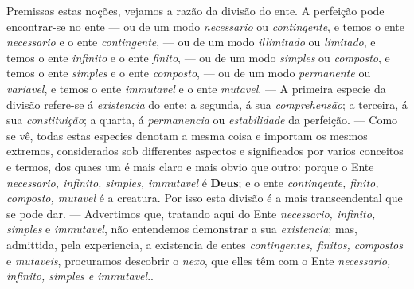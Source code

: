 {Premissas estas noções, vejamos a razão da divisão do ente. A perfeição pode
encontrar-se no ente --- ou de um modo \emph{necessario} ou \emph{contingente}, e temos o
ente \emph{necessario} e o ente \emph{contingente}, --- ou de um modo \emph{illimitado} ou
\emph{limitado}, e temos o ente \emph{infinito} e o ente \emph{finito}, --- ou de um modo
\emph{simples} ou \emph{composto}, e temos o ente \emph{simples} e o ente
\emph{composto}, --- ou de um modo \emph{permanente} ou \emph{variavel}, e temos o ente
\emph{immutavel} e o ente \emph{mutavel}. --- A primeira especie da divisão refere-se á
\emph{existencia} do ente; a segunda, á sua \emph{comprehensão}; a terceira, á sua
\emph{constituição}; a quarta, á \emph{permanencia} ou \emph{estabilidade} da perfeição.
--- Como se vê, todas estas especies denotam a mesma coisa e importam os mesmos extremos,
considerados sob differentes aspectos e significados por varios conceitos e termos, dos
quaes um é mais claro e mais obvio que outro: porque o Ente \emph{necessario, infinito,
simples, immutavel} é \textbf{Deus}; e o ente \emph{contingente, finito, composto,
mutavel} é a creatura. Por isso esta divisão é a mais transcendental que se pode dar. ---
Advertimos que, tratando aqui do Ente \emph{necessario, infinito, simples} e
\emph{immutavel}, não entendemos demonstrar a sua \emph{existencia}; mas, admittida, pela
experiencia, a existencia de entes \emph{contingentes, finitos, compostos} e
\emph{mutaveis}, procuramos descobrir o \emph{nexo}, que elles têm com o Ente
\emph{necessario, infinito, simples e immutavel}.}.

